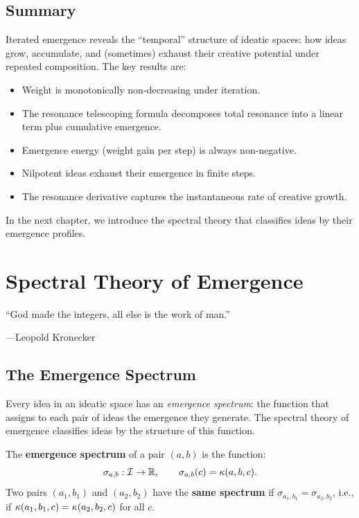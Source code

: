 \section{Summary}

Iterated emergence reveals the ``temporal'' structure of ideatic spaces: how
ideas grow, accumulate, and (sometimes) exhaust their creative potential under
repeated composition. The key results are:

\begin{itemize}
  \item Weight is monotonically non-decreasing under iteration.
  \item The resonance telescoping formula decomposes total resonance into a
    linear term plus cumulative emergence.
  \item Emergence energy (weight gain per step) is always non-negative.
  \item Nilpotent ideas exhaust their emergence in finite steps.
  \item The resonance derivative captures the instantaneous rate of creative
    growth.
\end{itemize}

In the next chapter, we introduce the spectral theory that classifies ideas by
their emergence profiles.



\chapter{Spectral Theory of Emergence}
\label{ch:spectral}

\epigraph{``God made the integers, all else is the work of man.''}
{---Leopold Kronecker}


\section{The Emergence Spectrum}

Every idea in an ideatic space has an \emph{emergence spectrum}: the function
that assigns to each pair of ideas the emergence they generate. The spectral
theory of emergence classifies ideas by the structure of this function.

\begin{definition}
\label{def:spectrum}
The \textbf{emergence spectrum} of a pair $(a,b)$ is the function:
\[
  \sigma_{a,b} : \mathcal{I} \to \mathbb{R}, \qquad \sigma_{a,b}(c) = \kappa(a, b, c).
\]
Two pairs $(a_1, b_1)$ and $(a_2, b_2)$ have the \textbf{same spectrum} if
$\sigma_{a_1,b_1} = \sigma_{a_2,b_2}$, i.e., if
$\kappa(a_1, b_1, c) = \kappa(a_2, b_2, c)$ for all $c$.
\end{definition}


